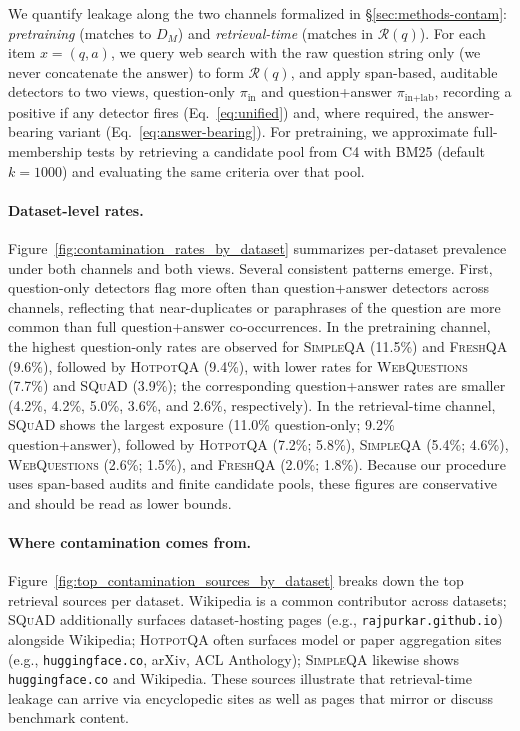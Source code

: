 We quantify leakage along the two channels formalized in \S\ref{sec:methods-contam}: \emph{pretraining} (matches to $D_M$) and \emph{retrieval-time} (matches in $\mathcal{R}(q)$). For each item $x{=}(q,a)$, we query web search with the raw question string only (we never concatenate the answer) to form $\mathcal{R}(q)$, and apply span-based, auditable detectors to two views, question-only $\pi_{\text{in}}$ and question+answer $\pi_{\text{in+lab}}$, recording a positive if any detector fires (Eq.~\eqref{eq:unified}) and, where required, the answer-bearing variant (Eq.~\eqref{eq:answer-bearing}). For pretraining, we approximate full-membership tests by retrieving a candidate pool from C4 with BM25 (default $k{=}1000$) and evaluating the same criteria over that pool.

\paragraph{Dataset-level rates.}
Figure~\ref{fig:contamination_rates_by_dataset} summarizes per-dataset prevalence under both channels and both views. Several consistent patterns emerge. First, question-only detectors flag more often than question+answer detectors across channels, reflecting that near-duplicates or paraphrases of the question are more common than full question+answer co-occurrences. In the pretraining channel, the highest question-only rates are observed for \textsc{SimpleQA} (11.5\%) and \textsc{FreshQA} (9.6\%), followed by \textsc{HotpotQA} (9.4\%), with lower rates for \textsc{WebQuestions} (7.7\%) and \textsc{SQuAD} (3.9\%); the corresponding question+answer rates are smaller (4.2\%, 4.2\%, 5.0\%, 3.6\%, and 2.6\%, respectively). In the retrieval-time channel, \textsc{SQuAD} shows the largest exposure (11.0\% question-only; 9.2\% question+answer), followed by \textsc{HotpotQA} (7.2\%; 5.8\%), \textsc{SimpleQA} (5.4\%; 4.6\%), \textsc{WebQuestions} (2.6\%; 1.5\%), and \textsc{FreshQA} (2.0\%; 1.8\%). Because our procedure uses span-based audits and finite candidate pools, these figures are conservative and should be read as lower bounds.

\paragraph{Where contamination comes from.}
Figure~\ref{fig:top_contamination_sources_by_dataset} breaks down the top retrieval sources per dataset. Wikipedia is a common contributor across datasets; \textsc{SQuAD} additionally surfaces dataset-hosting pages (e.g., \texttt{rajpurkar.github.io}) alongside Wikipedia; \textsc{HotpotQA} often surfaces model or paper aggregation sites (e.g., \texttt{huggingface.co}, arXiv, ACL Anthology); \textsc{SimpleQA} likewise shows \texttt{huggingface.co} and Wikipedia. These sources illustrate that retrieval-time leakage can arrive via encyclopedic sites as well as pages that mirror or discuss benchmark content.

